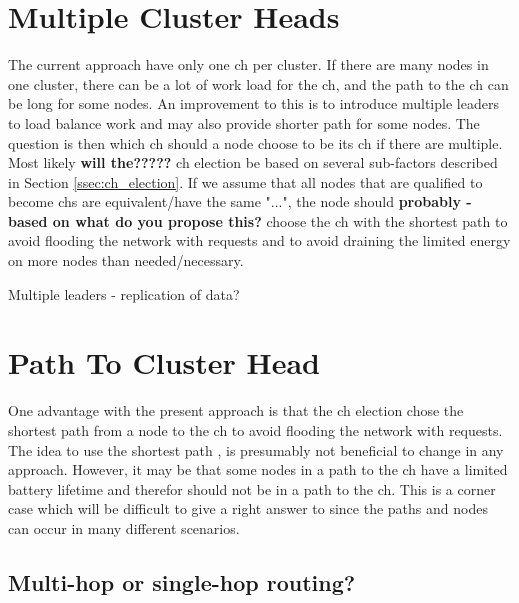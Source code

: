 \documentclass[USenglish]{uit-thesis}
\begin{document}


\section{Multiple Cluster Heads}
The current approach have only one \gls{ch} per cluster. If there are many nodes in one cluster, there can be a lot of work load for the \gls{ch}, and the path to the \gls{ch} can be long for some nodes.
An improvement to this is to introduce multiple leaders to load balance work and may also provide shorter path for some nodes. The question is then which \gls{ch} should a node choose to be its \gls{ch} if there are multiple. Most likely \textbf{will the?????} \gls{ch} election be based on several sub-factors described in Section \ref{ssec:ch_election}. If we assume that all nodes that are qualified to become \gls{ch}s are equivalent/have the same "...", the node should \textbf{probably - based on what do you propose this?} choose the \gls{ch} with the shortest path to avoid flooding the network with requests and to avoid draining the limited energy on more nodes than needed/necessary.

Multiple leaders - replication of data?

\section{Path To Cluster Head}
One advantage with the present approach is that the \gls{ch} election chose the shortest path from a node to the \gls{ch} to avoid flooding the network with requests. The idea to use the shortest path \cite{dijkstra}, is presumably not beneficial to change in any approach. However, it may be that some nodes in a path to the \gls{ch} have a limited battery lifetime and therefor should not be in a path to the \gls{ch}. This is a corner case which will be difficult to give a right answer to since the paths and nodes can occur in many different scenarios.


\subsection{Multi-hop or single-hop routing?}
\end{document}

